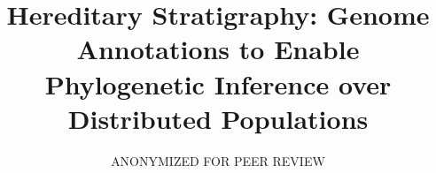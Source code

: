 \title{ Hereditary Stratigraphy: Genome Annotations to Enable Phylogenetic Inference over Distributed Populations }

\author{
ANONYMIZED FOR PEER REVIEW
}

\maketitle
